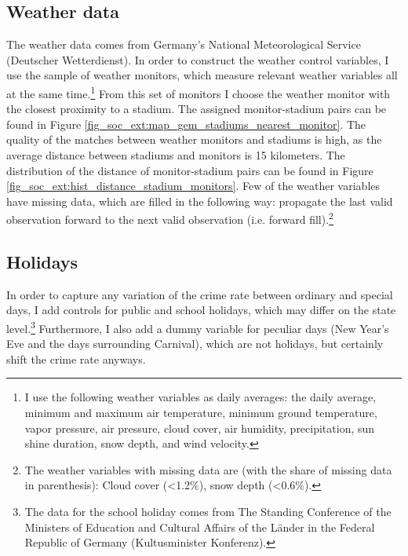 \documentclass[11pt, a4paper, draft]{article} %
\begin{document}
\subsection{Weather data}
The weather data comes from Germany's National Meteorological Service (Deutscher Wetterdienst). In order to construct the weather control variables, I use the sample of weather monitors, which measure relevant weather variables all at the same time.\footnote{I use the following weather variables as daily averages: the daily average, minimum and maximum air temperature,  minimum ground temperature, vapor pressure, air pressure, cloud cover, air humidity, precipitation, sun shine duration, snow depth, and wind velocity.} From this set of monitors I choose the weather monitor with the closest proximity to a stadium. The assigned monitor-stadium pairs can be found in Figure \ref{fig_soc_ext:map_gem_stadiums_nearest_monitor}. The quality of the matches between weather monitors and stadiums is high, as the average distance between stadiums and monitors is 15 kilometers. The distribution of the distance of monitor-stadium pairs can be found in Figure \ref{fig_soc_ext:hist_distance_stadium_monitors}. Few of the  weather variables have missing data, which are filled in the following way: propagate the last valid observation forward to the next valid observation (i.e. forward fill).\footnote{The weather variables with missing data are (with the share of missing data in parenthesis): Cloud cover (<1.2\%), snow depth (<0.6\%).}



\subsection{Holidays}
In order to capture any variation of the crime rate between ordinary and special days, I add controls for public and school holidays, which may differ on the state level.\footnote{The data for the school holiday comes from The Standing Conference of the Ministers of Education and Cultural Affairs of the Länder in the Federal Republic of Germany (Kultusminister Konferenz).} Furthermore, I also add a dummy variable for peculiar days (New Year's Eve and the days surrounding Carnival), which are not holidays, but certainly shift the crime rate anyways.
\end{document}

